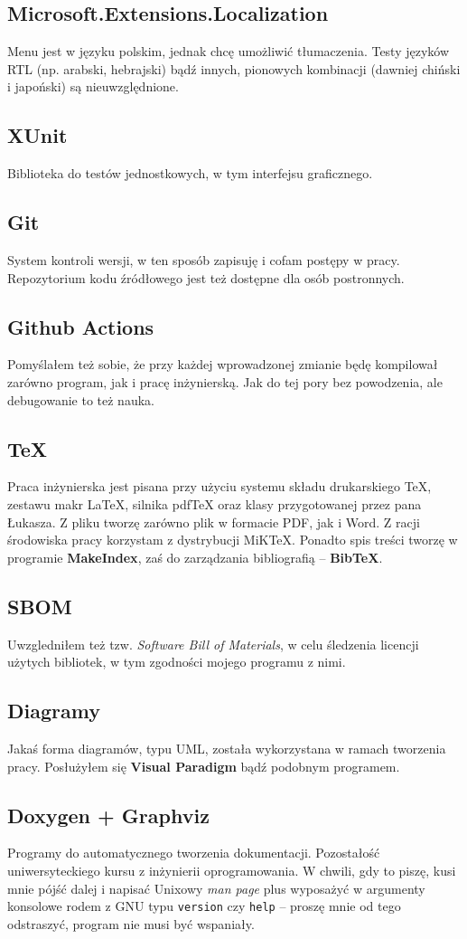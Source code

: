 \documentclass{SGGW-thesis}
\begin{document}
\subsection{Microsoft.Extensions.Localization}
Menu jest w języku polskim, jednak chcę umożliwić tłumaczenia. Testy języków RTL (np. arabski, hebrajski) bądź innych, pionowych kombinacji (dawniej chiński i japoński) są nieuwzględnione.
\subsection{XUnit}
Biblioteka do testów jednostkowych, w tym interfejsu graficznego.
\subsection{Git}
System kontroli wersji, w ten sposób zapisuję i cofam postępy w pracy. Repozytorium kodu źródłowego jest też dostępne dla osób postronnych.
\subsection{Github Actions}
Pomyślałem też sobie, że przy każdej wprowadzonej zmianie będę kompilował zarówno program, jak i pracę inżynierską. Jak do tej pory bez powodzenia, ale debugowanie to też nauka.
\subsection{\TeX}
Praca inżynierska jest pisana przy użyciu systemu składu drukarskiego \TeX, zestawu makr \LaTeX, silnika pdfTeX oraz klasy przygotowanej przez pana Łukasza. Z pliku tworzę zarówno plik w formacie PDF, jak i Word. Z racji środowiska pracy korzystam z dystrybucji MiKTeX. Ponadto spis treści tworzę w programie \textbf{MakeIndex}, zaś do zarządzania bibliografią -- \textbf{BibTeX}.
\subsection{SBOM}
Uwzgledniłem też tzw. \textit{Software Bill of Materials}, w celu śledzenia licencji użytych bibliotek, w tym zgodności mojego programu z nimi.
\subsection{Diagramy}
Jakaś forma diagramów, typu UML, została wykorzystana w ramach tworzenia pracy. Posłużyłem się \textbf{Visual Paradigm} bądź podobnym programem.
\subsection{Doxygen + Graphviz}
Programy do automatycznego tworzenia dokumentacji. Pozostałość uniwersyteckiego kursu z inżynierii oprogramowania. W chwili, gdy to piszę, kusi mnie pójść dalej i napisać Unixowy \textit{man page} plus wyposażyć w argumenty konsolowe rodem z GNU typu \texttt{\-\-version} czy \texttt{\-\-help} -- proszę mnie od tego odstraszyć, program nie musi być wspaniały.
\end{document}
